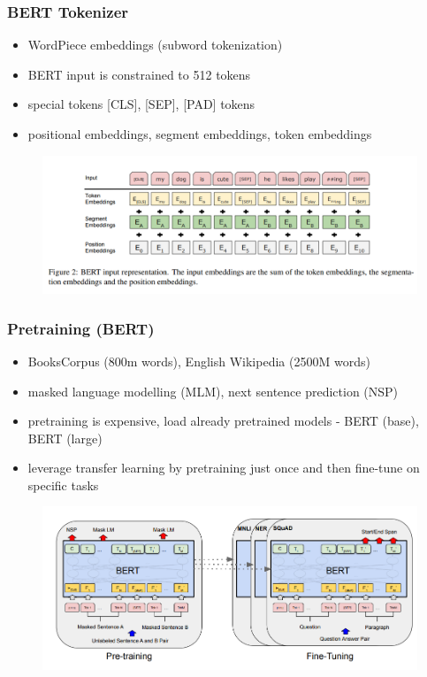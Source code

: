\documentclass{beamer}
\begin{document}
\begin{frame}
    \frametitle{BERT Tokenizer}
    \begin{itemize}
        \item WordPiece embeddings (subword tokenization)\parencite{wordPiece}
        \item BERT input is constrained to 512 tokens
        \item special tokens [CLS], [SEP], [PAD] tokens
        \item positional embeddings, segment embeddings, token embeddings
    \end{itemize}
    \begin{figure}
    \includegraphics[scale=0.3]{images/bert_internal_representation.png}
    \end{figure}
\end{frame}

\begin{frame}
    \frametitle{Pretraining (BERT)}    
    \begin{itemize} 
        \item BooksCorpus (800m words), English Wikipedia (2500M words)
        \item masked language modelling (MLM), next sentence prediction (NSP)
        \item pretraining is expensive, load already pretrained models - BERT (base), BERT (large)
        \item leverage transfer learning by pretraining just once and then fine-tune on specific tasks
    \end{itemize}
    \begin{figure}
        \includegraphics[scale=0.25]{images/pretraining.png}
    \end{figure}

\end{frame}
\end{document}
